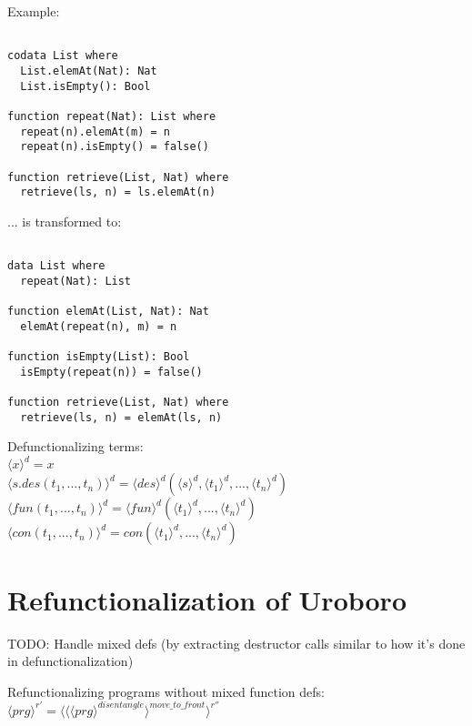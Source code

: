 \documentclass[11pt]{article} %
\begin{document}
Example:

\begin{lstlisting}

codata List where
  List.elemAt(Nat): Nat
  List.isEmpty(): Bool

function repeat(Nat): List where
  repeat(n).elemAt(m) = n
  repeat(n).isEmpty() = false()

function retrieve(List, Nat) where
  retrieve(ls, n) = ls.elemAt(n)

\end{lstlisting}

... is transformed to:

\begin{lstlisting}

data List where
  repeat(Nat): List

function elemAt(List, Nat): Nat
  elemAt(repeat(n), m) = n

function isEmpty(List): Bool
  isEmpty(repeat(n)) = false()

function retrieve(List, Nat) where
  retrieve(ls, n) = elemAt(ls, n)

\end{lstlisting}

Defunctionalizing terms: \\
$\langle x \rangle^d = x$ \\
$\langle s.des(t_1, ..., t_n) \rangle^d = \langle des \rangle^d (\langle s \rangle^d, \langle t_1 \rangle^d, ..., \langle t_n \rangle^d)$ \\
$\langle fun(t_1, ..., t_n) \rangle^d = \langle fun \rangle^d (\langle t_1 \rangle^d, ..., \langle t_n \rangle^d)$ \\
$\langle con(t_1, ..., t_n) \rangle^d = con(\langle t_1 \rangle^d, ..., \langle t_n \rangle^d)$ \\

\section{Refunctionalization of Uroboro}

TODO: Handle mixed defs (by extracting destructor calls similar to how it's done in defunctionalization)

Refunctionalizing programs without mixed function defs: $\langle prg \rangle^{r'} = \langle \langle \langle prg \rangle^{disentangle} \rangle^{move\_to\_front} \rangle^{r''}$
\end{document}
